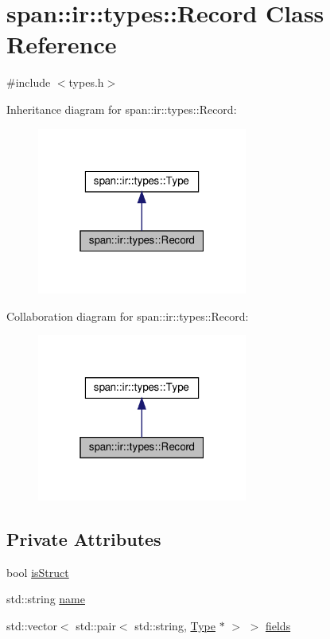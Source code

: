 \hypertarget{classspan_1_1ir_1_1types_1_1Record}{}\section{span\+:\+:ir\+:\+:types\+:\+:Record Class Reference}
\label{classspan_1_1ir_1_1types_1_1Record}


{\ttfamily \#include $<$types.\+h$>$}



Inheritance diagram for span\+:\+:ir\+:\+:types\+:\+:Record\+:\nopagebreak
\begin{figure}[H]
\begin{center}
\leavevmode
\includegraphics[width=196pt]{classspan_1_1ir_1_1types_1_1Record__inherit__graph}
\end{center}
\end{figure}


Collaboration diagram for span\+:\+:ir\+:\+:types\+:\+:Record\+:\nopagebreak
\begin{figure}[H]
\begin{center}
\leavevmode
\includegraphics[width=196pt]{classspan_1_1ir_1_1types_1_1Record__coll__graph}
\end{center}
\end{figure}
\subsection*{Private Attributes}
\begin{DoxyCompactItemize}
\item 
bool \hyperlink{classspan_1_1ir_1_1types_1_1Record_a74049e704dca0f9274d322838c284141}{is\+Struct}
\item 
std\+::string \hyperlink{classspan_1_1ir_1_1types_1_1Record_a25b466e4e13c470698683dc9f402bea7}{name}
\item 
std\+::vector$<$ std\+::pair$<$ std\+::string, \hyperlink{classspan_1_1ir_1_1types_1_1Type}{Type} $\ast$ $>$ $>$ \hyperlink{classspan_1_1ir_1_1types_1_1Record_a37a26c710224ad6402ecfb4424369273}{fields}
\end{DoxyCompactItemize}
